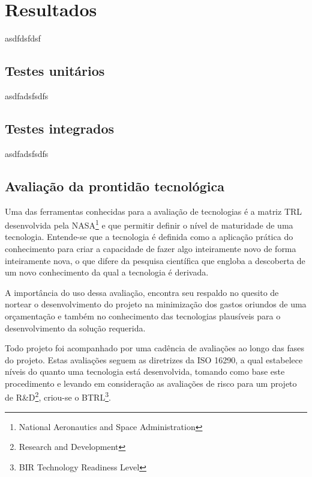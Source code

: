 \chapter{Resultados}
\label{chap:result}
asdfdsfdsf

\section{Testes unitários}
\label{sec:testu}
asdfadsfsdfs



\section{Testes integrados}
\label{sec:testi}
asdfadsfsdfs

\section{Avaliação da prontidão tecnológica}
\label{sec:trl}
Uma das ferramentas conhecidas para a avaliação de tecnologias é a matriz TRL desenvolvida pela NASA\footnote{National Aeronautics and Space Administration} e que permitir definir o nível de maturidade de uma tecnologia. Entende-se que a tecnologia é definida como a aplicação prática do conhecimento para criar a capacidade de fazer algo inteiramente novo de forma inteiramente nova, o que difere da pesquisa científica que engloba a descoberta de um novo conhecimento da qual a tecnologia é derivada.

A importância do uso dessa avaliação, encontra seu respaldo no quesito de nortear o desenvolvimento do projeto na minimização dos gastos oriundos de uma orçamentação e também no conhecimento das tecnologias plausíveis para o desenvolvimento da solução requerida.

Todo projeto foi acompanhado por uma cadência de avaliações ao longo das fases do projeto. Estas avaliações seguem as diretrizes da ISO 16290, a qual estabelece níveis do quanto uma tecnologia está desenvolvida, tomando como base este procedimento e levando em consideração as avaliações de risco para um projeto de R\&D\footnote{Research and Development}, criou-se o BTRL\footnote{BIR Technology Readiness Level}. 

